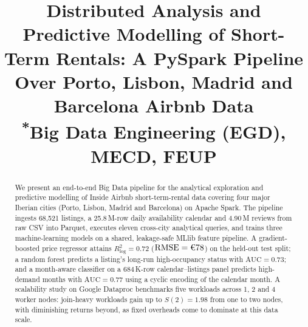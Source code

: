 \documentclass[conference]{IEEEtran}
\begin{document}
\title{Distributed Analysis and Predictive Modelling of Short-Term Rentals: A PySpark Pipeline Over Porto, Lisbon, Madrid and Barcelona Airbnb Data\\
{\footnotesize \textsuperscript{*}Big Data Engineering (EGD), MECD, FEUP}}

\author{
    \and
    \and
    \and
    \and
}


\maketitle

\begin{abstract}
We present an end-to-end Big Data pipeline for the analytical exploration and predictive modelling of Inside Airbnb short-term-rental data covering four major Iberian cities (Porto, Lisbon, Madrid and Barcelona) on Apache Spark. The pipeline ingests 68{,}521 listings, a 25.8\,M-row daily availability calendar and 4.90\,M reviews from raw CSV into Parquet, executes eleven cross-city analytical queries, and trains three machine-learning models on a shared, leakage-safe MLlib feature pipeline. A gradient-boosted price regressor attains $R^2_{\log} = 0.72$ ($\text{RMSE} = \text{\texteuro}78$) on the held-out test split; a random forest predicts a listing's long-run high-occupancy status with $\text{AUC}=0.73$; and a month-aware classifier on a 684\,K-row calendar--listings panel predicts high-demand months with $\text{AUC}=0.77$ using a cyclic encoding of the calendar month. A scalability study on Google Dataproc benchmarks five workloads across 1, 2 and 4 worker nodes: join-heavy workloads gain up to $S(2)=1.98$ from one to two nodes, with diminishing returns beyond, as fixed overheads come to dominate at this data scale.
\end{abstract}
\end{document}
